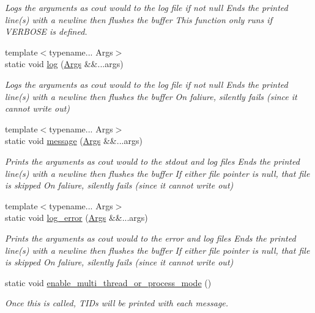 \begin{DoxyCompactItemize}
\begin{DoxyCompactList}\small\item\em Logs the arguments as cout would to the log file if not null Ends the printed line(s) with a newline then flushes the buffer This function only runs if V\+E\+R\+B\+O\+SE is defined. \end{DoxyCompactList}\item 
{\footnotesize template$<$typename... Args$>$ }\\static void \hyperlink{class_utilities_a996db67175e47946e80539602c2ca6ee}{log} (\hyperlink{struct_args}{Args} \&\&...args)
\begin{DoxyCompactList}\small\item\em Logs the arguments as cout would to the log file if not null Ends the printed line(s) with a newline then flushes the buffer On faliure, silently fails (since it cannot write out) \end{DoxyCompactList}\item 
{\footnotesize template$<$typename... Args$>$ }\\static void \hyperlink{class_utilities_ae8efd2e8950fe6641d87296b8120d246}{message} (\hyperlink{struct_args}{Args} \&\&...args)
\begin{DoxyCompactList}\small\item\em Prints the arguments as cout would to the stdout and log files Ends the printed line(s) with a newline then flushes the buffer If either file pointer is null, that file is skipped On faliure, silently fails (since it cannot write out) \end{DoxyCompactList}\item 
{\footnotesize template$<$typename... Args$>$ }\\static void \hyperlink{class_utilities_a3db9e78ec85d66d104cbf451706e1dbe}{log\+\_\+error} (\hyperlink{struct_args}{Args} \&\&...args)
\begin{DoxyCompactList}\small\item\em Prints the arguments as cout would to the error and log files Ends the printed line(s) with a newline then flushes the buffer If either file pointer is null, that file is skipped On faliure, silently fails (since it cannot write out) \end{DoxyCompactList}\item 
static void \hyperlink{class_utilities_a384728ae9b72982c1351d881ba7ff007}{enable\+\_\+multi\+\_\+thread\+\_\+or\+\_\+process\+\_\+mode} ()
\begin{DoxyCompactList}\small\item\em Once this is called, T\+I\+Ds will be printed with each message. \end{DoxyCompactList}\end{DoxyCompactItemize}
